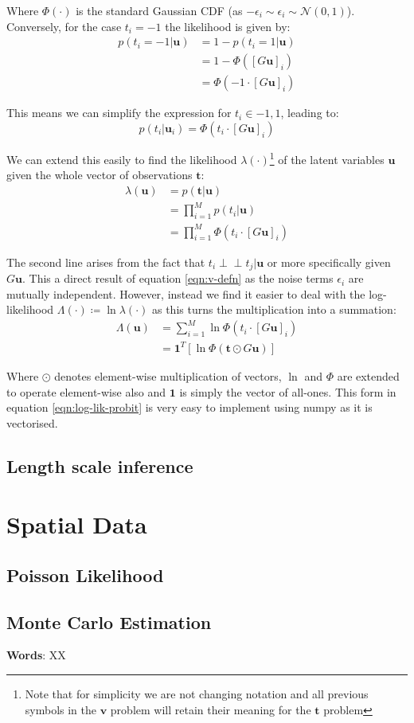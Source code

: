 \documentclass[]{article}
\newcommand{\Ncal}{\mathcal{N}}
\newcommand{\lik}{\lambda}
\newcommand{\loglik}{\Lambda}
\newcommand{\indep}{\perp \!\!\! \perp}
\newcommand{\tbold}{\boldsymbol{t}}
\newcommand{\ubold}{\boldsymbol{u}}
\newcommand{\vbold}{\boldsymbol{v}}
\begin{document}
Where $\Phi(\cdot)$ is the standard Gaussian CDF (as $-\epsilon_i \sim \epsilon_i \sim \Ncal(0,1)$). Conversely, for the case $t_i = -1$ the likelihood is given by:
%
\begin{align}
	p(t_i = -1 | \ubold) &= 1 - p(t_i = 1 | \ubold) \nonumber \\
	&= 1 - \Phi([G\ubold]_i) \nonumber \\
	&= \Phi(-1 \cdot [G\ubold]_i)
\end{align}

This means we can simplify the expression for $t_i \in {-1, 1}$, leading to:
%
\begin{equation}
	p(t_i | \ubold_i) = \Phi(t_i \cdot [G\ubold]_i)
\end{equation}

We can extend this easily to find the likelihood $\lik(\cdot)$\footnote{Note that for simplicity we are not changing notation and all previous symbols in the $\vbold$ problem will retain their meaning for the $\tbold$ problem} of the latent variables $\ubold$ given the whole vector of observations $\tbold$:
%
\begin{align}
	\lik(\ubold) &= p(\tbold | \ubold) \nonumber \\
	&= \prod_{i=1}^{M} p(t_i | \ubold) \nonumber \\
	&= \prod_{i=1}^{M} \Phi(t_i \cdot [G\ubold]_i)
\end{align}

The second line arises from the fact that $t_i \indep t_j | \ubold$ or more specifically given $G\ubold$. This a direct result of equation \ref{eqn:v-defn} as the noise terms $\epsilon_i$ are mutually independent. However, instead we find it easier to deal with the log-likelihood $\loglik(\cdot) \coloneqq \ln \lik(\cdot)$ as this turns the multiplication into a summation:
%
\begin{align}
	\loglik(\ubold) &= \sum_{i=1}^{M} \ln \Phi(t_i \cdot [G\ubold]_i) \nonumber \\
	&= \mathbf{1}^T \left[ \ln \Phi(\tbold \odot G\ubold) \right]
	\label{eqn:log-lik-probit}
\end{align}

Where $\odot$ denotes element-wise multiplication of vectors, $\ln$ and $\Phi$ are extended to operate element-wise also and $\mathbf{1}$ is simply the vector of all-ones. This form in equation \ref{eqn:log-lik-probit} is very easy to implement using numpy as it is vectorised.

\subsection{Length scale inference}

\section{Spatial Data}

\subsection{Poisson Likelihood}

\subsection{Monte Carlo Estimation}

\textbf{Words}: XX
\end{document}
